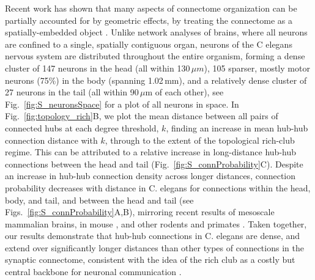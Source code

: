 \documentclass[10pt,letterpaper]{article}
\begin{document}
Recent work has shown that many aspects of connectome organization can be partially accounted for by geometric effects, by treating the connectome as a spatially-embedded object \cite{Henderson:2014fg, Roberts2016, Horvat:2016ia}.
Unlike network analyses of brains, where all neurons are confined to a single, spatially contiguous organ, neurons of the C elegans nervous system are distributed throughout the entire organism, forming a dense cluster of 147 neurons in the head (all within 130\,$\mu m$), 105 sparser, mostly motor neurons (75\%) in the body (spanning 1.02\,mm), and a relatively dense cluster of 27 neurons in the tail (all within 90\,$\mu$m of each other), see Fig.~\ref{fig:S_neuronsSpace} for a plot of all neurons in space.
In Fig.~\ref{fig:topology_rich}B, we plot the mean distance between all pairs of connected hubs at each degree threshold, $k$, finding an increase in mean hub-hub connection distance with $k$, through to the extent of the topological rich-club regime.
This can be attributed to a relative increase in long-distance hub-hub connections between the head and tail (Fig.~\ref{fig:S_connProbability}C).
Despite an increase in hub-hub connection density across longer distances, connection probability decreases with distance in C. elegans for connections within the head, body, and tail, and between the head and tail (see Figs.~\ref{fig:S_connProbability}A,B), mirroring recent results of mesoscale mammalian brains, in mouse \cite{Goulas:2016hr, Fulcher:2016ck}, and other rodents and primates \cite{Horvat:2016ia}.
Taken together, our results demonstrate that hub-hub connections in C. elegans are dense, and extend over significantly longer distances than other types of connections in the synaptic connectome, consistent with the idea of the rich club as a costly but central backbone for neuronal communication \cite{vandenHeuvel:2012kh}.

\end{document}
